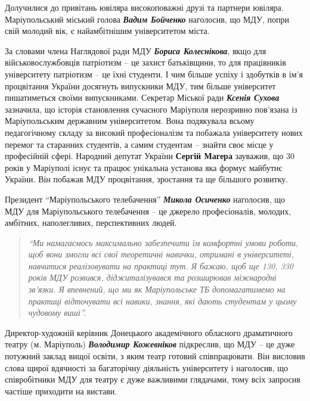 Долучилися до привітань ювіляра високоповажні друзі та партнери ювіляра.
Маріупольський міський голова \emph{\textbf{Вадим Бойченко}} наголосив, що МДУ, попри свій
молодий вік, є найамбітнішим університетом міста.


За словами члена Наглядової ради МДУ \emph{\textbf{Бориса Колеснікова}}, якщо для
військовослужбовців патріотизм –  це захист батьківщини, то для працівників
університету патріотизм – це їхні студенти. І чим більше успіху і здобутків в
ім'я процвітання України досягнуть випускники МДУ, тим більше університет
пишатиметься своїми випускниками. Секретар Міської ради \emph{\textbf{Ксенія Сухова}}
зазначила, що історія становлення сучасного Маріуполя нерозривно пов'язана із
Маріупольським державним університетом. Вона подякувала всьому педагогічному
складу за високий професіоналізм та побажала університету нових перемог та
старанних студентів, а самим студентам – знайти своє місце у професійній сфері.
Народний депутат України \textbf{\textbf{Сергій Магера}} зауважив, що 30 років у Маріуполі існує
та працює унікальна установа яка формує майбутнє України. Він побажав МДУ
процвітання, зростання та ще більшого розвитку.


Президент \enquote{Маріупольського телебачення} \emph{\textbf{Микола Осиченко}} наголосив, що МДУ для
Маріупольського телебачення – це джерело професіоналів, молодих, амбітних,
наполегливих, перспективних людей.

\begin{quote}
\em\enquote{Ми намагаємось максимально забезпечити їм
комфортні умови роботи, щоб вони змогли всі свої теоретичні навички, отримані в
університеті, навчитися реалізовувати на практиці тут. Я бажаю, щоб ще 130, 330
років МДУ розвився, діджиталізувався та розширював міжнародні зв'язки. Я
впевнений, що ми як Маріупольське ТБ допомагатимемо на практиці відточувати всі
навики, знання, які дають студентам у цьому чудовому виші}.
\end{quote}

Директор-художній керівник Донецького академічного обласного драматичного
театру (м. Маріуполь) \emph{\textbf{Володимир Кожевніков}} підкреслив, що МДУ – це дуже
потужний заклад вищої освіти, з яким театр готовий співпрацювати. Він висловив
слова щирої вдячності за багаторічну діяльність університету і наголосив, що
співробітники МДУ для театру є дуже важливими глядачами, тому всіх запросив
частіше приходити на вистави.

